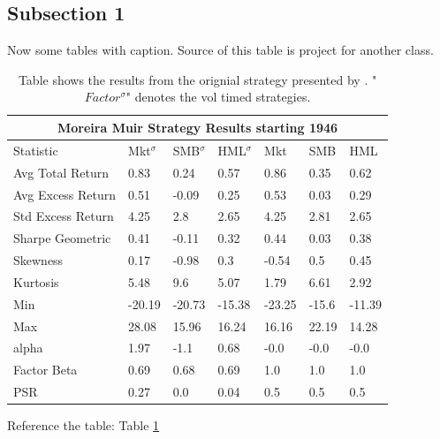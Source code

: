 \documentclass[a4paper,12pt]{article}
\begin{document}
	\subsection{Subsection 1}
	Now some tables with caption. Source of this table is project for another class.
	\begin{table}[H]
	\begin{center}
    \begin{tabular}{l l l l l l l}
    \toprule
    \multicolumn{7}{c}{Moreira Muir Strategy Results starting 1946} \\
    \midrule
             Statistic &     Mkt$^{\sigma}$ &     SMB$^{\sigma}$ &    HML$^{\sigma}$ &     Mkt &    SMB &     HML \\
    \midrule
  Avg Total Return &    0.83 &    0.24 &    0.57 &    0.86 &   0.35 &    0.62 \\
 Avg Excess Return &    0.51 &   -0.09 &    0.25 &    0.53 &   0.03 &    0.29 \\
 Std Excess Return &    4.25 &     2.8 &    2.65 &    4.25 &   2.81 &    2.65 \\
  Sharpe Geometric &    0.41 &   -0.11 &    0.32 &    0.44 &   0.03 &    0.38 \\
          Skewness &    0.17 &   -0.98 &     0.3 &   -0.54 &    0.5 &    0.45 \\
          Kurtosis &    5.48 &     9.6 &    5.07 &    1.79 &   6.61 &    2.92 \\
               Min &  -20.19 &  -20.73 &  -15.38 &  -23.25 &  -15.6 &  -11.39 \\
               Max &   28.08 &   15.96 &   16.24 &   16.16 &  22.19 &   14.28 \\
             alpha &    1.97 &    -1.1 &    0.68 &    -0.0 &   -0.0 &    -0.0 \\
       Factor Beta &    0.69 &    0.68 &    0.69 &     1.0 &    1.0 &     1.0 \\
               PSR &    0.27 &     0.0 &    0.04 &     0.5 &    0.5 &     0.5 \\
    \bottomrule
    \end{tabular}
	 \caption[Moreira Muir Strategy Results]{Table shows the results from the orignial strategy presented by \cite{Moreira2017}. "$Factor^{\sigma}$" denotes the vol timed strategies.}
    \label{tab:MMresults}
    \end{center}
    \end{table}
	Reference the table: Table \ref{tab:MMresults}\\
	
\end{document}
